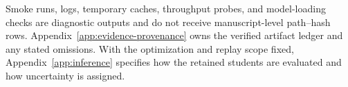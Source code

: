 Smoke runs, logs, temporary caches, throughput probes, and model-loading checks are diagnostic outputs and do not receive manuscript-level path--hash rows.
Appendix~\ref{app:evidence-provenance} owns the verified artifact ledger and any stated omissions.
With the optimization and replay scope fixed, Appendix~\ref{app:inference} specifies how the retained students are evaluated and how uncertainty is assigned.
